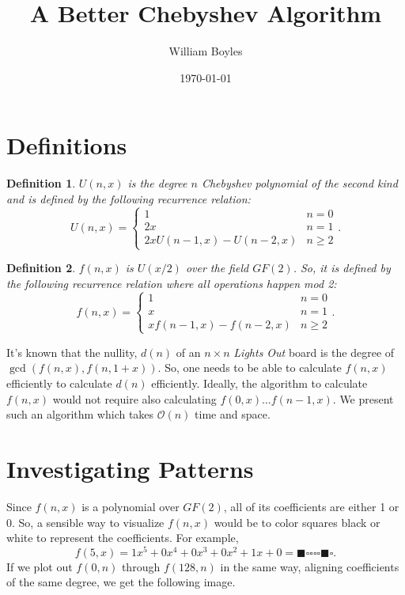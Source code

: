 \documentclass{article}
\newtheorem{definition}{Definition}
\renewcommand{\O}{\mathcal{O}}
\begin{document}
	\title{A Better Chebyshev Algorithm}
	\author{William Boyles}
	\date{\today}
	\maketitle
	
	\section{Definitions}
	\begin{definition}
		$U(n,x)$ is the degree $n$ Chebyshev polynomial of the second kind and is defined by the following recurrence relation:
		\begin{equation*}
			U(n,x) = \begin{cases}
				1 & n = 0 \\
				2x & n = 1 \\
				2x U(n-1,x) - U(n-2,x) & n \geq 2
			\end{cases}.
		\end{equation*}
	\end{definition}
	\begin{definition}
		$f(n,x)$ is $U(x/2)$ over the field $GF(2)$.
		So, it is defined by the following recurrence relation where all operations happen mod 2:
		\begin{equation*}
			f(n,x) = \begin{cases}
				1 & n = 0 \\
				x & n = 1 \\
				x f(n-1,x) - f(n-2,x) & n \geq 2
			\end{cases}.
		\end{equation*}
	\end{definition}
	It's known that the nullity, $d(n)$ of an $n \times n$ \textit{Lights Out} board is the degree of $\gcd(f(n,x), f(n,1+x))$.
	So, one needs to be able to calculate $f(n,x)$ efficiently to calculate $d(n)$ efficiently.
	Ideally, the algorithm to calculate $f(n,x)$ would not require also calculating $f(0,x) \dots f(n-1,x)$.
	We present such an algorithm which takes $\O(n)$ time and space.
	
	\section{Investigating Patterns}
	Since $f(n,x)$ is a polynomial over $GF(2)$, all of its coefficients are either 1 or 0.
	So, a sensible way to visualize $f(n,x)$ would be to color squares black or white to represent the coefficients.
	For example,
	\begin{equation*}
		f(5,x) = 1x^5 + 0x^4 + 0x^3 + 0x^2 + 1x + 0 = \blacksquare\square\square\square\square\blacksquare\square.
	\end{equation*}
	If we plot out $f(0,n)$ through $f(128,n)$ in the same way, aligning coefficients of the same degree, we get the following image.
	
\end{document}
